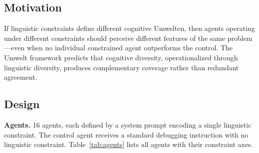 \documentclass[11pt,a4paper]{article}
\begin{document}
\subsection{Motivation}

If linguistic constraints define different cognitive Umwelten, then agents operating under different constraints should perceive different features of the same problem---even when no individual constrained agent outperforms the control. The Umwelt framework predicts that cognitive diversity, operationalized through linguistic diversity, produces complementary coverage rather than redundant agreement.

\subsection{Design}

\textbf{Agents.} 16 agents, each defined by a system prompt encoding a single linguistic constraint. The control agent receives a standard debugging instruction with no linguistic constraint. Table~\ref{tab:agents} lists all agents with their constraint axes.
\end{document}
